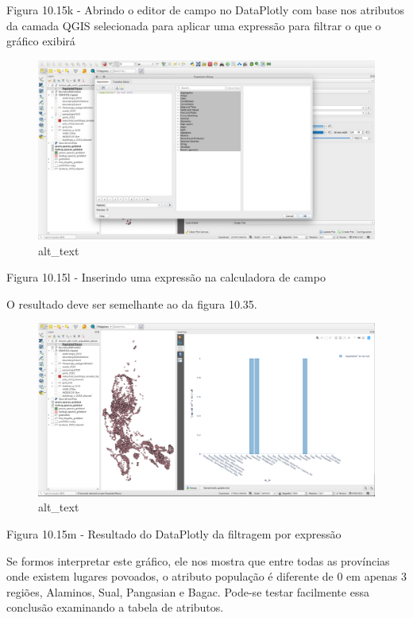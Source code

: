 \documentclass[
  portuguese,
]{krantz}
\begin{document}
Figura 10.15k - Abrindo o editor de campo no DataPlotly com base nos atributos da camada QGIS selecionada para aplicar uma expressão para filtrar o que o gráfico exibirá

\begin{figure}
\centering
\includegraphics{media/modulo10/fig1015_l.png}
\caption{alt\_text}
\end{figure}

Figura 10.15l - Inserindo uma expressão na calculadora de campo

O resultado deve ser semelhante ao da figura 10.35.

\begin{figure}
\centering
\includegraphics{media/modulo10/fig1015_m.png}
\caption{alt\_text}
\end{figure}

Figura 10.15m - Resultado do DataPlotly da filtragem por expressão

Se formos interpretar este gráfico, ele nos mostra que entre todas as províncias onde existem lugares povoados, o atributo população é diferente de 0 em apenas 3 regiões, Alaminos, Sual, Pangasian e Bagac. Pode-se testar facilmente essa conclusão examinando a tabela de atributos.
\end{document}
